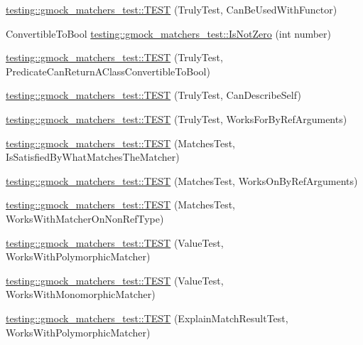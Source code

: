 \begin{DoxyCompactItemize}
\mbox{\hyperlink{namespacetesting_1_1gmock__matchers__test_ab3e259f3ae45e199474d7c6d554852f0}{testing\+::gmock\+\_\+matchers\+\_\+test\+::\+T\+E\+ST}} (Truly\+Test, Can\+Be\+Used\+With\+Functor)
\item 
Convertible\+To\+Bool \mbox{\hyperlink{namespacetesting_1_1gmock__matchers__test_a248045bc57c8bad87b7d185b5c292f60}{testing\+::gmock\+\_\+matchers\+\_\+test\+::\+Is\+Not\+Zero}} (int number)
\item 
\mbox{\hyperlink{namespacetesting_1_1gmock__matchers__test_a24529fd7834d272009af74106422fe54}{testing\+::gmock\+\_\+matchers\+\_\+test\+::\+T\+E\+ST}} (Truly\+Test, Predicate\+Can\+Return\+A\+Class\+Convertible\+To\+Bool)
\item 
\mbox{\hyperlink{namespacetesting_1_1gmock__matchers__test_af474a9719e614d521c71bdf7c39f6a7a}{testing\+::gmock\+\_\+matchers\+\_\+test\+::\+T\+E\+ST}} (Truly\+Test, Can\+Describe\+Self)
\item 
\mbox{\hyperlink{namespacetesting_1_1gmock__matchers__test_ae702d436c52bd37fe3e8d405d7e6a691}{testing\+::gmock\+\_\+matchers\+\_\+test\+::\+T\+E\+ST}} (Truly\+Test, Works\+For\+By\+Ref\+Arguments)
\item 
\mbox{\hyperlink{namespacetesting_1_1gmock__matchers__test_a6617484cbb644af9882fc5d853112aae}{testing\+::gmock\+\_\+matchers\+\_\+test\+::\+T\+E\+ST}} (Matches\+Test, Is\+Satisfied\+By\+What\+Matches\+The\+Matcher)
\item 
\mbox{\hyperlink{namespacetesting_1_1gmock__matchers__test_a6cfa391c9035262ccdc0d8f59e037b4d}{testing\+::gmock\+\_\+matchers\+\_\+test\+::\+T\+E\+ST}} (Matches\+Test, Works\+On\+By\+Ref\+Arguments)
\item 
\mbox{\hyperlink{namespacetesting_1_1gmock__matchers__test_a9fd734ae5afb64a7285503bc0870c255}{testing\+::gmock\+\_\+matchers\+\_\+test\+::\+T\+E\+ST}} (Matches\+Test, Works\+With\+Matcher\+On\+Non\+Ref\+Type)
\item 
\mbox{\hyperlink{namespacetesting_1_1gmock__matchers__test_a150118d4e990ba9fb9978329e742c931}{testing\+::gmock\+\_\+matchers\+\_\+test\+::\+T\+E\+ST}} (Value\+Test, Works\+With\+Polymorphic\+Matcher)
\item 
\mbox{\hyperlink{namespacetesting_1_1gmock__matchers__test_a53403682e9ffc12152b0b1c7f55dfa12}{testing\+::gmock\+\_\+matchers\+\_\+test\+::\+T\+E\+ST}} (Value\+Test, Works\+With\+Monomorphic\+Matcher)
\item 
\mbox{\hyperlink{namespacetesting_1_1gmock__matchers__test_a985e2bc1546b67de764d759de111e8e9}{testing\+::gmock\+\_\+matchers\+\_\+test\+::\+T\+E\+ST}} (Explain\+Match\+Result\+Test, Works\+With\+Polymorphic\+Matcher)

\end{DoxyCompactItemize}
